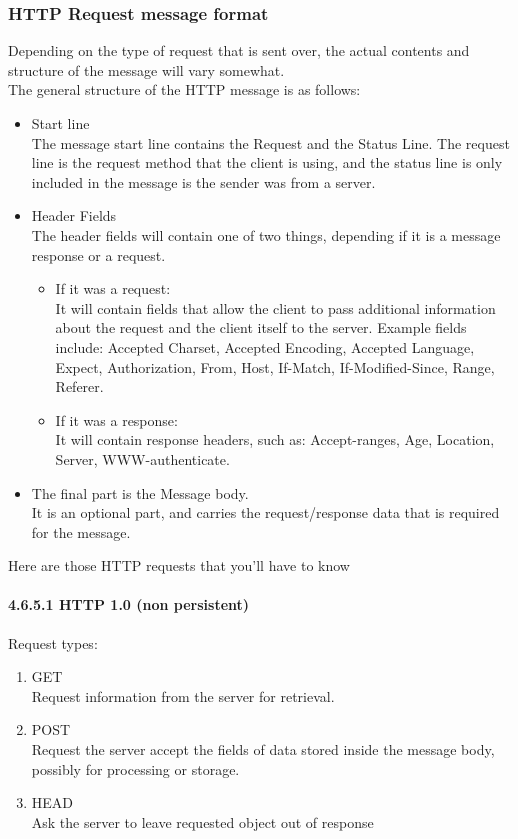\documentclass{article}
\begin{document}
\subsubsection{HTTP Request message format}
Depending on the type of request that is sent over, the actual contents and structure of the message will vary somewhat. \\
The general structure of the HTTP message is as follows:
\begin{itemize}
    \item Start line \\
    The message start line contains the Request  and  the Status Line. The request line is the request method that the client is using, and the status line is only included in the message is the sender was from a server.
    \item Header Fields\\
    The header fields will contain one of two things, depending if it is a message response or a request.
    \begin{itemize}
        \item If it was a request:\\
        It will contain fields that allow the client to pass additional information about the request and the client itself to the server. Example fields include: Accepted Charset, Accepted Encoding, Accepted Language, Expect, Authorization, From, Host, If-Match, If-Modified-Since, Range, Referer.
        \item If it was a response:\\
        It will contain response headers, such as: Accept-ranges, Age, Location, Server, WWW-authenticate.
    \end{itemize}
    \item The final part is the Message body. \\
    It is an optional part, and carries the request/response data that is required for the message.
\end{itemize}
Here are those HTTP requests that you'll have to know\\
\paragraph{4.6.5.1 HTTP 1.0 (non persistent)}
Request types:
\begin{enumerate}
    \item GET\\
    Request information from the server for retrieval.
    \item POST \\
    Request the server accept the fields of data stored inside the message body, possibly for processing or storage.
    \item HEAD\\
    Ask the server to leave requested object out of response
\end{enumerate}
\end{document}
